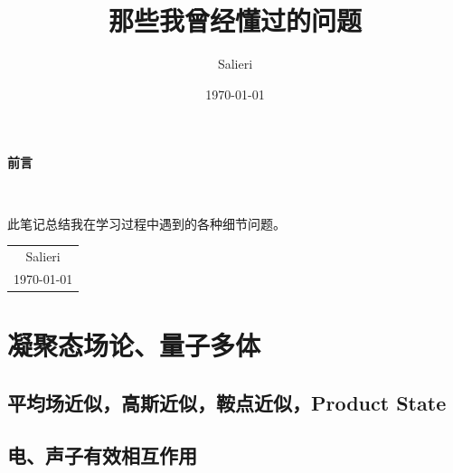 \documentclass[12pt, a4paper, oneside]{ctexbook}
\title{{\Huge{\textbf{那些我曾经懂过的问题}}}\\}
\author{Salieri}
\date{\today}
\begin{document}
	\maketitle
	
	\setcounter{page}{1}
	
	\begin{center}
		\Huge\textbf{前言}
	\end{center}~\
	
	此笔记总结我在学习过程中遇到的各种细节问题。
	~\\
	\begin{flushright}
		\begin{tabular}{c}
			Salieri\\
			\today
		\end{tabular}
	\end{flushright}
	
	\newpage
	\setcounter{page}{1}
	\tableofcontents
	\newpage
	\setcounter{page}{1}
	\chapter{凝聚态场论、量子多体}
	\section{平均场近似，高斯近似，鞍点近似，Product State}
    \section{电、声子有效相互作用}
\end{document}

